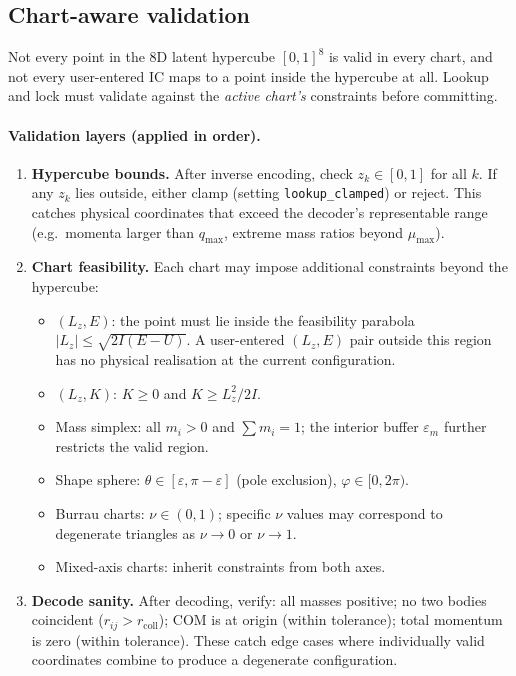 \documentclass[11pt]{report}
\begin{document}
\subsection{Chart-aware validation}
\label{sec:chart_validation}

Not every point in the 8D latent hypercube $[0,1]^{8}$ is valid in every chart, and not every user-entered IC maps to a point inside the hypercube at all. Lookup and lock must validate against the \emph{active chart's} constraints before committing.

\paragraph{Validation layers (applied in order).}
\begin{enumerate}[nosep]
\item \textbf{Hypercube bounds.} After inverse encoding, check $z_k\in[0,1]$ for all $k$. If any $z_k$ lies outside, either clamp (setting \texttt{lookup\_clamped}) or reject. This catches physical coordinates that exceed the decoder's representable range (e.g.\ momenta larger than $q_{\max}$, extreme mass ratios beyond $\mu_{\max}$).
\item \textbf{Chart feasibility.} Each chart may impose additional constraints beyond the hypercube:
\begin{itemize}[nosep]
\item $(L_z,E)$: the point must lie inside the feasibility parabola $|L_z|\le\sqrt{2I(E-U)}$. A user-entered $(L_z,E)$ pair outside this region has no physical realisation at the current configuration.
\item $(L_z,K)$: $K\ge 0$ and $K\ge L_z^2/2I$.
\item Mass simplex: all $m_i>0$ and $\sum m_i=1$; the interior buffer $\varepsilon_m$ further restricts the valid region.
\item Shape sphere: $\theta\in[\varepsilon,\pi-\varepsilon]$ (pole exclusion), $\varphi\in[0,2\pi)$.
\item Burrau charts: $\nu\in(0,1)$; specific $\nu$ values may correspond to degenerate triangles as $\nu\to 0$ or $\nu\to 1$.
\item Mixed-axis charts: inherit constraints from both axes.
\end{itemize}
\item \textbf{Decode sanity.} After decoding, verify: all masses positive; no two bodies coincident ($r_{ij}>r_{\mathrm{coll}}$); COM is at origin (within tolerance); total momentum is zero (within tolerance). These catch edge cases where individually valid coordinates combine to produce a degenerate configuration.
\end{enumerate}
\end{document}
